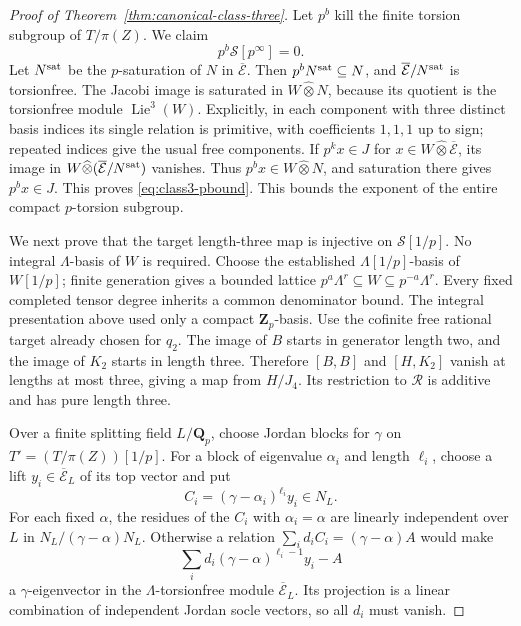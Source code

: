 \begin{proof}[Proof of Theorem~\ref{thm:canonical-class-three}]
Let \(p^b\) kill the finite torsion subgroup of \(T/\pi(Z)\).
We claim
\begin{equation}\label{eq:class3-pbound}
                         p^b\mathcal S[p^\infty]=0.
\end{equation}
Let \(N^{\rm sat}\) be the \(p\)-saturation of \(N\) in
\(\overline{\mathcal E}\). Then \(p^bN^{\rm sat}\subseteq N\), and
\(\overline{\mathcal E}/N^{\rm sat}\) is torsionfree.
The Jacobi image is saturated in \(W\widehat\otimes N\),
because its quotient is the torsionfree module
\(\operatorname{Lie}^3(W)\). Explicitly, in each component
with three distinct basis indices its single relation is
primitive, with coefficients \(1,1,1\) up to sign; repeated
indices give the usual free components.
If \(p^kx\in J\) for \(x\in W\widehat\otimes\overline{\mathcal E}\), its
image in \(W\widehat\otimes(\overline{\mathcal E}/N^{\rm sat})\) vanishes.
Thus \(p^bx\in W\widehat\otimes N\), and saturation there
gives \(p^bx\in J\). This proves \eqref{eq:class3-pbound}.
This bounds the exponent of the entire compact $p$-torsion subgroup.

We next prove that the target length-three map is
injective on \(\mathcal S[1/p]\).
No integral \(\Lambda\)-basis of \(W\) is required.
Choose the established \(\Lambda[1/p]\)-basis of
\(W[1/p]\); finite generation gives a bounded lattice
\(p^a\Lambda^r\subseteq W\subseteq p^{-a}\Lambda^r\).
Every fixed completed tensor degree inherits a common
denominator bound. The integral presentation above used
only a compact \(\mathbf Z_p\)-basis.
Use the cofinite free rational target already chosen for
\(q_2\). The image of \(B\) starts in generator length two,
and the image of \(K_2\) starts in length three.
Therefore \([B,B]\) and \([H,K_2]\) vanish at lengths at
most three, giving a map from \(H/J_4\).
Its restriction to \(\mathcal R\) is additive and has pure length
three.

Over a finite splitting field \(L/\mathbf Q_p\), choose
Jordan blocks for \(\gamma\) on
\(T'=(T/\pi(Z))[1/p]\).
For a block of eigenvalue \(\alpha_i\) and length \(\ell_i\),
choose a lift \(y_i\in\overline{\mathcal E}_L\) of its top vector and put
\[
 C_i=(\gamma-\alpha_i)^{\ell_i}y_i\in N_L.
\]
For each fixed \(\alpha\), the residues of the \(C_i\) with
\(\alpha_i=\alpha\) are linearly independent over \(L\) in
\(N_L/(\gamma-\alpha)N_L\). Otherwise a relation
\(\sum_i d_iC_i=(\gamma-\alpha)A\) would make
\[
 \sum_i d_i(\gamma-\alpha)^{\ell_i-1}y_i-A
\]
a \(\gamma\)-eigenvector in the \(\Lambda\)-torsionfree module
\(\overline{\mathcal E}_L\). Its projection is a linear combination of
independent Jordan socle vectors, so all \(d_i\) must vanish.


\end{proof}
